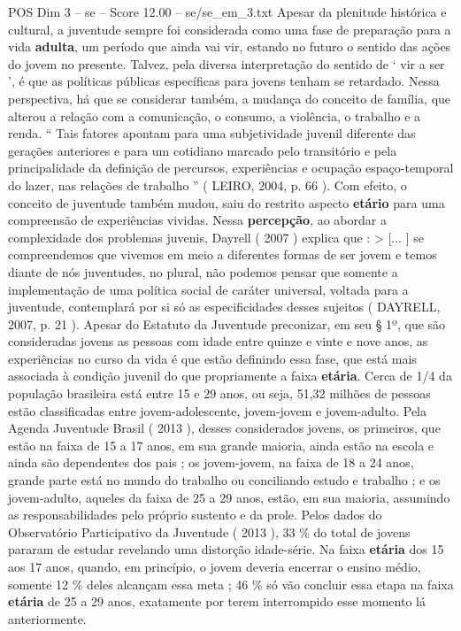 \begin{textsample}{POS Dim 3 – se – Score 12.00 – se/se\_em\_3.txt}
Apesar da plenitude histórica e cultural, a juventude sempre foi considerada como uma fase de preparação para a vida \textbf{adulta}, um período que ainda vai vir, estando no futuro o sentido das ações do jovem no presente.
Talvez, pela diversa interpretação do sentido de ‘ vir a ser ’, é que as políticas públicas específicas para jovens tenham se retardado.
Nessa perspectiva, há que se considerar também, a mudança do conceito de família, que alterou a relação com a comunicação, o consumo, a violência, o trabalho e a renda. “ Tais fatores apontam para uma subjetividade juvenil diferente das gerações anteriores e para um cotidiano marcado pelo transitório e pela principalidade da definição de percursos, experiências e ocupação espaço-temporal do lazer, nas relações de trabalho ” ( LEIRO, 2004, p. 66 ).
Com efeito, o conceito de juventude também mudou, saiu do restrito aspecto \textbf{etário} para uma compreensão de experiências vividas.
Nessa \textbf{percepção}, ao abordar a complexidade dos problemas juvenis, Dayrell ( 2007 ) explica que : > [... ] se compreendemos que vivemos em meio a diferentes formas de ser jovem e temos diante de nós juventudes, no plural, não podemos pensar que somente a implementação de uma política social de caráter universal, voltada para a juventude, contemplará por si só as especificidades desses sujeitos ( DAYRELL, 2007, p. 21 ).
Apesar do Estatuto da Juventude preconizar, em seu § 1º, que são consideradas jovens as pessoas com idade entre quinze e vinte e nove anos, as experiências no curso da vida é que estão definindo essa fase, que está mais associada à condição juvenil do que propriamente a faixa \textbf{etária}.
Cerca de 1/4 da população brasileira está entre 15 e 29 anos, ou seja, 51,32 milhões de pessoas estão classificadas entre jovem-adolescente, jovem-jovem e jovem-adulto.
Pela Agenda Juventude Brasil ( 2013 ), desses considerados jovens, os primeiros, que estão na faixa de 15 a 17 anos, em sua grande maioria, ainda estão na escola e ainda são dependentes dos pais ; os jovem-jovem, na faixa de 18 a 24 anos, grande parte está no mundo do trabalho ou conciliando estudo e trabalho ; e os jovem-adulto, aqueles da faixa de 25 a 29 anos, estão, em sua maioria, assumindo as responsabilidades pelo próprio sustento e da prole.
Pelos dados do Observatório Participativo da Juventude ( 2013 ), 33 \% do total de jovens pararam de estudar revelando uma distorção idade-série.
Na faixa \textbf{etária} dos 15 aos 17 anos, quando, em princípio, o jovem deveria encerrar o ensino médio, somente 12 \% deles alcançam essa meta ; 46 \% só vão concluir essa etapa na faixa \textbf{etária} de 25 a 29 anos, exatamente por terem interrompido esse momento lá anteriormente.

\end{textsample}
